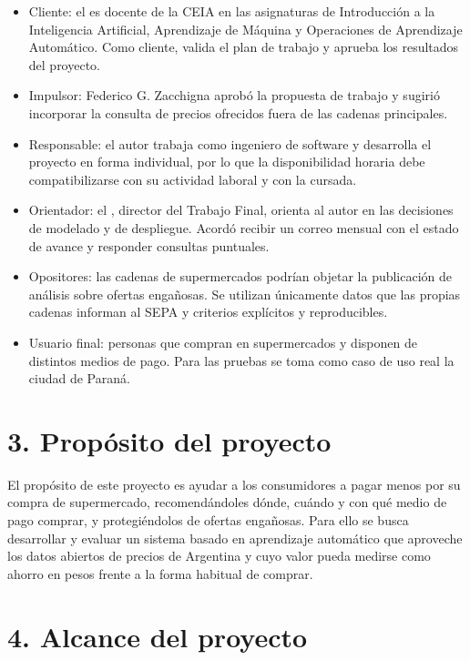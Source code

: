 \documentclass[
11pt, %
]{charter}
\begin{document}
\begin{itemize}
	\item Cliente: el \clientename\hspace{1px} es docente de la CEIA en las asignaturas de Introducción a la Inteligencia Artificial, Aprendizaje de Máquina y Operaciones de Aprendizaje Automático. Como cliente, valida el plan de trabajo y aprueba los resultados del proyecto.
	\item Impulsor: Federico G. Zacchigna aprobó la propuesta de trabajo y sugirió incorporar la consulta de precios ofrecidos fuera de las cadenas principales.
	\item Responsable: el autor trabaja como ingeniero de software y desarrolla el proyecto en forma individual, por lo que la disponibilidad horaria debe compatibilizarse con su actividad laboral y con la cursada.
	\item Orientador: el \supname, director del Trabajo Final, orienta al autor en las decisiones de modelado y de despliegue. Acordó recibir un correo mensual con el estado de avance y responder consultas puntuales.
	\item Opositores: las cadenas de supermercados podrían objetar la publicación de análisis sobre ofertas engañosas. Se utilizan únicamente datos que las propias cadenas informan al SEPA y criterios explícitos y reproducibles.
	\item Usuario final: personas que compran en supermercados y disponen de distintos medios de pago. Para las pruebas se toma como caso de uso real la ciudad de Paraná.
\end{itemize}

\section{3. Propósito del proyecto}
\label{sec:proposito}

El propósito de este proyecto es ayudar a los consumidores a pagar menos por su compra de supermercado, recomendándoles dónde, cuándo y con qué medio de pago comprar, y protegiéndolos de ofertas engañosas. Para ello se busca desarrollar y evaluar un sistema basado en aprendizaje automático que aproveche los datos abiertos de precios de Argentina y cuyo valor pueda medirse como ahorro en pesos frente a la forma habitual de comprar.

\section{4. Alcance del proyecto}
\label{sec:alcance}
\end{document}
